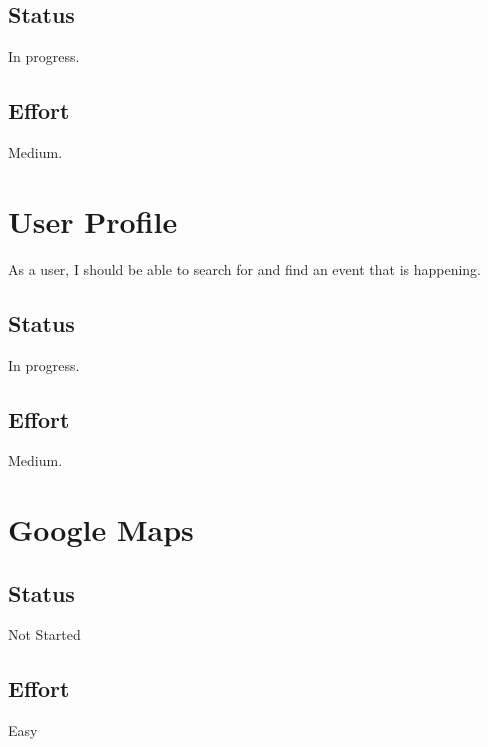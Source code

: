 \documentclass[10pt,a4paper]{article}
\begin{document}
\subsection{Status}
In progress.

\subsection{Effort}
Medium.


\section{User Profile}
As a user, I should be able to search for and find an event that is happening.
\subsection{Status}
In progress.

\subsection{Effort}
Medium.

\section{Google Maps}

\subsection{Status}
Not Started

\subsection{Effort}
Easy
\end{document}
